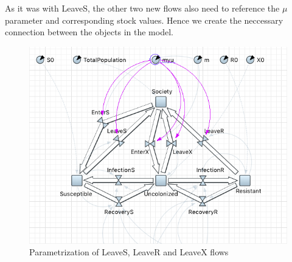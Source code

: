 As it was with LeaveS, the other two new flows also need to reference the $\mu$ parameter and corresponding stock values. Hence we create the neccessary connection between the objects in the model.

\begin{figure}[H]
  \centering
  \includegraphics[height=0.5\text width]{img/screens/society/society14}
  \caption{Parametrization of LeaveS, LeaveR and LeaveX flows}
\end{figure}
